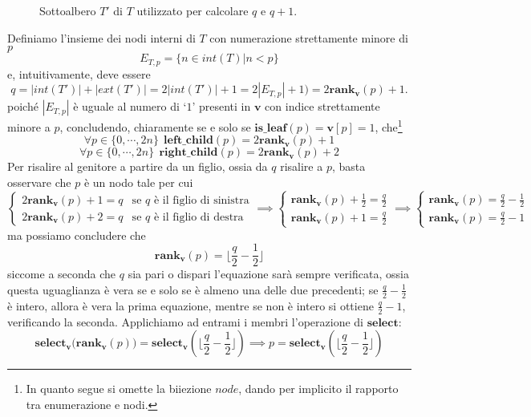 \begin{figure}[h]
	\caption{Sottoalbero $T'$ di $T$ utilizzato per calcolare $q$ e $q+1$.}
	\label{fig:btree_rappr_step}
\end{figure}

Definiamo l'insieme dei nodi interni di $T$ con numerazione strettamente 
minore di $p$
$$
E_{T, p} = \{n \in int(T) | n < p \}
$$
e, intuitivamente, deve essere 
$$
q = |int(T')| + |ext(T')| = 2 |int(T')| + 1 = 2 |E_{T,p}| + 1 ) = 2 \mathbf{rank_v}(p) + 1. 
$$
poiché $|E_{T,p}|$ è uguale al numero di `$1$' presenti in $\mathbf{v}$ con indice 
strettamente minore a $p$, concludendo, chiaramente se e solo se 
$\mathbf{is\_leaf}(p) = \mathbf{v}[p] = 1$, che\footnote{In quanto segue si omette 
la biiezione $node$, dando per implicito il rapporto tra enumerazione e nodi.}
$$
\forall p \in \{0, \cdots, 2n\} ~~ \mathbf{left\_child}(p) = 2 \mathbf{rank_v}(p) + 1
$$
$$
\forall p \in \{0, \cdots, 2n\} ~~ \mathbf{right\_child}(p) = 2 \mathbf{rank_v}(p) + 2
$$
Per risalire al genitore a partire da un figlio, ossia da $q$ risalire a $p$, 
basta osservare che $p$ è un nodo tale per cui 
$$
\begin{cases}
    2\mathbf{rank_v}(p) + 1 = q & \text{se } q \text{ è il figlio di sinistra} \\
    2\mathbf{rank_v}(p) + 2 = q & \text{se } q \text{ è il figlio di destra}
\end{cases} 
\implies
\begin{cases}
    \mathbf{rank_v}(p) + \frac{1}{2} = \frac{q}{2} \\
    \mathbf{rank_v}(p) + 1 = \frac{q}{2} 
\end{cases} 
\implies
\begin{cases}
    \mathbf{rank_v}(p) = \frac{q}{2}  - \frac{1}{2}\\
    \mathbf{rank_v}(p) = \frac{q}{2} - 1
\end{cases} 
$$
ma possiamo concludere che 
$$
    \mathbf{rank_v}(p) = \lfloor \frac{q}{2} - \frac{1}{2} \rfloor
$$
siccome a seconda che $q$ sia pari o dispari l'equazione sarà sempre verificata, 
ossia questa uguaglianza è vera se e solo se è almeno una delle due precedenti; 
se $\frac{q}{2} - \frac{1}{2}$ è intero, allora è vera la prima equazione, mentre 
se non è intero si ottiene $\frac{q}{2} - 1$, verificando la seconda.
Applichiamo ad entrami i membri l'operazione di $\mathbf{select}$: 
$$
\mathbf{select_v(rank_v}(p)) = \mathbf{select_v}(\lfloor \frac{q}{2} - \frac{1}{2} \rfloor) 
\implies p = \mathbf{select_v}(\lfloor \frac{q}{2} - \frac{1}{2} \rfloor) 
$$

